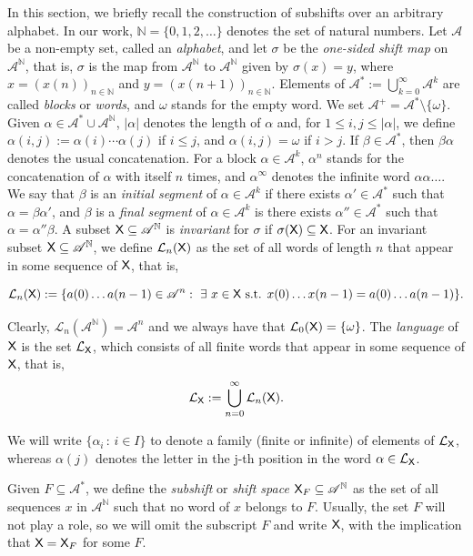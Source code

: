 \documentclass[a4paper,12pt]{amsart}
\theoremstyle{definition}
\theoremstyle{remark}
\numberwithin{equation}{section}
\newcommand{\osf}{{\normalfont \textsf{X}}}
\newcommand{\lang}{\CL_{\osf}}
\newcommand{\alf}{\mathscr{A}}
\newcommand{\N}{\mathbb{N}}
\newcommand{\CL}{\mathcal{L}}
\newcommand{\nn}{\mathbb{N}}
\newcommand{\eword}{\omega}
\begin{document}
In this section, we briefly recall the construction of subshifts over an arbitrary alphabet. In our work, $\nn=\{0,1,2,\ldots\}$ denotes the set of natural numbers. Let $\alf$ be a non-empty set, called an \emph{alphabet}, and let $\sigma$ be the \emph{one-sided shift map} on $\alf^\N$, that is, $\sigma$ is the map from $\alf^\N$ to $\alf^\N$ given by $\sigma(x)=y$, where $x=(x(n))_{n\in \N}$ and  $y=(x(n+1))_{n\in \N}$. Elements of $\alf^*:=\bigcup_{k=0}^\infty \alf^k$ are called \emph{blocks} or \emph{words}, and $\omega$ stands for the empty word. We set $\alf^+=\alf^*\setminus\{\eword\}$. Given $\alpha\in\alf^*\cup\alf^{\N}$, $|\alpha|$ denotes the length of $\alpha$ and, for $1\leq i,j\leq |\alpha|$, we define $\alpha(i,j):=\alpha(i)\cdots\alpha(j)$ if $i\leq j$, and $\alpha(i,j)=\eword$ if $i>j$. If $\beta\in\alf^*$, then $\beta\alpha$ denotes the usual concatenation. For a block $\alpha\in \alf^k$, $\alpha^n$ stands for the concatenation of $\alpha$ with itself $n$ times, and $\alpha^\infty$ denotes the infinite word $\alpha \alpha \ldots$. We say that $\beta$ is an \emph{initial segment} of $\alpha \in \alf^k$ if there exists $\alpha'\in \alf^*$ such that $\alpha=\beta \alpha'$, and $\beta$ is a \emph{final segment} of $\alpha \in \alf^k$ is there exists $\alpha''\in \alf^*$ such that $\alpha = \alpha'' \beta$. A subset $\osf \subseteq \alf^\N$ is \emph{invariant} for $\sigma$ if $\sigma (\osf)\subseteq \osf$. For an invariant subset $\osf \subseteq \alf^\N$, we define $\CL_n(\osf)$ as the set of all words of length $n$ that appear in some sequence of $\osf$, that is, 

$$\CL_n(\osf):=\{a(0) \ldots a(n-1)\in \alf^n:\ \exists \ x\in \osf \text{ s.t. } x(0)\ldots x(n-1)=a(0)\ldots a(n-1)\}.$$ 

Clearly, $\CL_n(\alf^\N)=\alf^n$ and we always have that $\CL_0(\osf)=\{\omega\}$.
The \emph{language} of $\osf$ is the set $\lang$, which consists of all finite words that appear in some sequence of $\osf$, that is,
$$\lang:=\bigcup_{n=0}^\infty\CL_n(\osf).$$

 We will write $\{\alpha_i\,:\,i\in I\}$ to denote a family (finite or infinite) of elements of $\lang$, whereas $\alpha(j)$ denotes the letter in the j-th position in the word $\alpha\in \lang$. %


\smallskip

Given $F\subseteq \alf^*$, we define the \emph{subshift} or \emph{shift space} $\osf_F\subseteq \alf^\N$ as the set of all sequences $x$ in $\alf^\N$ such that no word of $x$ belongs to $F$. Usually, the set $F$ will not play a role, so we will omit the subscript $F$ and write $\osf$, with the implication that $\osf=\osf_F$ for some $F$. 
\medbreak
\end{document}
